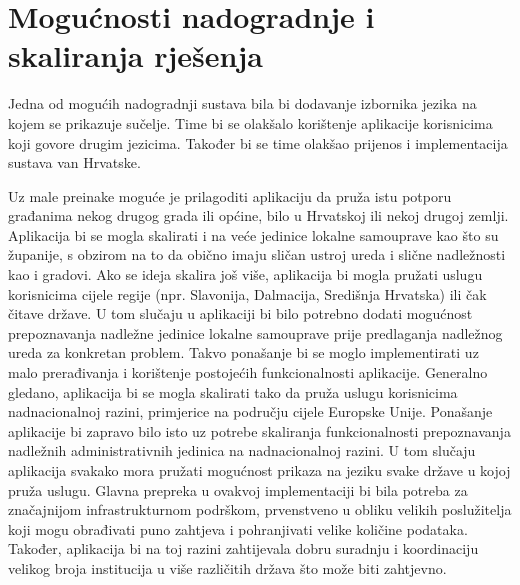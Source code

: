 		\eject
		
		\section{Mogućnosti nadogradnje i skaliranja rješenja} 
		
		Jedna od mogućih nadogradnji sustava bila bi dodavanje izbornika jezika na kojem se prikazuje sučelje. Time bi se olakšalo korištenje aplikacije korisnicima koji govore drugim jezicima. Također bi se time olakšao prijenos i implementacija sustava van Hrvatske.
		
		Uz male preinake moguće je prilagoditi aplikaciju da pruža istu potporu građanima nekog drugog grada ili općine, bilo u Hrvatskoj ili nekoj drugoj zemlji. Aplikacija bi se mogla skalirati i na veće jedinice lokalne samouprave kao što su županije, s obzirom na to da obično imaju sličan ustroj ureda i slične nadležnosti kao i gradovi. Ako se ideja skalira još više, aplikacija bi mogla pružati uslugu korisnicima cijele regije (npr. Slavonija, Dalmacija, Središnja Hrvatska) ili čak čitave države. U tom slučaju u aplikaciji bi bilo potrebno dodati mogućnost prepoznavanja nadležne jedinice lokalne samouprave prije predlaganja nadležnog ureda za konkretan problem. Takvo ponašanje bi se moglo implementirati uz malo prerađivanja i korištenje postojećih funkcionalnosti aplikacije. Generalno gledano, aplikacija bi se mogla skalirati tako da pruža uslugu korisnicima nadnacionalnoj razini, primjerice na području cijele Europske Unije. Ponašanje aplikacije bi zapravo bilo isto uz potrebe skaliranja funkcionalnosti prepoznavanja nadležnih administrativnih jedinica na nadnacionalnoj razini. U tom slučaju aplikacija svakako mora pružati mogućnost prikaza na jeziku svake države u kojoj pruža uslugu. Glavna prepreka u ovakvoj implementaciji bi bila potreba za značajnijom infrastrukturnom podrškom, prvenstveno u obliku velikih poslužitelja koji mogu obrađivati puno zahtjeva i pohranjivati velike količine podataka. Također, aplikacija bi na toj razini zahtijevala dobru suradnju i koordinaciju velikog broja institucija u više različitih država što može biti zahtjevno.
		
		\eject
		